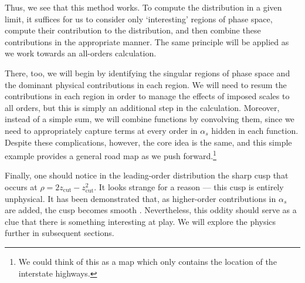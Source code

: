 \documentclass[../thesis.tex]{subfiles}
\providecommand{\zcut}{z_\mathrm{{cut}}}
\begin{document}
	Thus, we see that this method works. To compute the distribution in a given limit, it suffices for us to consider only `interesting' regions of phase space, compute their contribution to the distribution, and then combine these contributions in the appropriate manner. The same principle will be applied as we work towards an all-orders calculation. 

	There, too, we will begin by identifying the singular regions of phase space and the dominant physical contributions in each region. We will need to resum the contributions in each region in order to manage the effects of imposed scales to all orders, but this is simply an additional step in the calculation. Moreover, instead of a simple sum, we will combine functions by convolving them, since we need to appropriately capture terms at every order in $\alpha_s$ hidden in each function. Despite these complications, however, the core idea is the same, and this simple example provides a general road map as we push forward.\footnote{We could think of this as a map which only contains the location of the interstate highways.}

	Finally, one should notice in the leading-order distribution the sharp cusp that occurs at $\rho = 2\zcut - \zcut^2$. It looks strange for a reason --- this cusp is entirely unphysical. It has been demonstrated that, as higher-order contributions in $\alpha_s$ are added, the cusp becomes smooth \cite{larkoski_improving_2020}. Nevertheless, this oddity should serve as a clue that there is something interesting at play. We will explore the physics further in subsequent sections.


%  
% 
\end{document}
